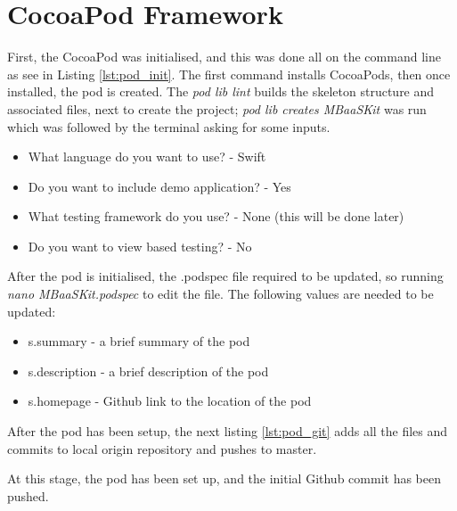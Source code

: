 

\section{CocoaPod Framework}

First, the CocoaPod was initialised, and this was done all on the command line as see in Listing \ref{lst:pod_init}. The first command installs CocoaPods, then once installed, the pod is created. The \textit{pod lib lint} builds the skeleton structure and associated files, next to create the project; \textit{pod lib creates MBaaSKit} was run which was followed by the terminal asking for some inputs.



\begin{itemize}
  \item What language do you want to use?
  - Swift
  \item Do you want to include demo application?
  - Yes
  \item What testing framework do you use?
  - None (this will be done later)
  \item Do you want to view based testing?
  - No
\end{itemize}

After the pod is initialised, the .podspec file required to be updated, so running \textit{nano MBaaSKit.podspec} to edit the file. The following values are needed to be updated: 

\begin{itemize}
  \item s.summary
  - a brief summary of the pod
  \item s.description
  - a brief description of the pod
  \item s.homepage
  - Github link to the location of the pod
\end{itemize}

After the pod has been setup, the next listing \ref{lst:pod_git} adds all the files and commits to local origin repository and pushes to master.



At this stage, the pod has been set up, and the initial Github commit has been pushed. 

